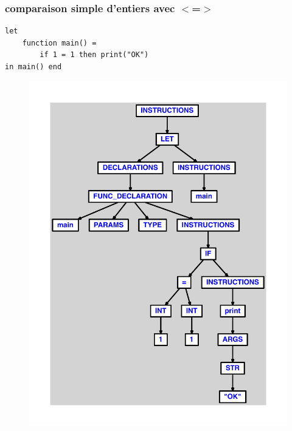 \documentclass{article}
\begin{document}
\subsubsection{comparaison simple d'entiers avec $ < $=$ > $}
\begin{lstlisting}
let
	function main() =
		if 1 = 1 then print("OK")
in main() end
\end{lstlisting}
\newpage
\begin{figure}[H]
\centering
\includegraphics[max width=\textwidth]{ast/ast_171.pdf}
\end{figure}
\newpage
\end{document}
